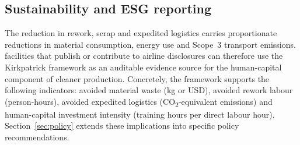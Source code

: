 \subsection{Sustainability and ESG reporting}
\label{subsec:mgr-esg}

The reduction in rework, scrap and expedited logistics carries
proportionate reductions in material consumption, energy use and Scope~3
transport emissions. \MRO{} facilities that publish or contribute to
airline \ESG{} disclosures can therefore use the Kirkpatrick framework as
an auditable evidence source for the human-capital component of cleaner
production. Concretely, the framework supports the following \ESG{}
indicators: avoided material waste (kg or USD), avoided rework labour
(person-hours), avoided expedited logistics (CO\textsubscript{2}-equivalent
emissions) and human-capital investment intensity (training hours per
direct labour hour). Section~\ref{sec:policy} extends these implications
into specific policy recommendations.
